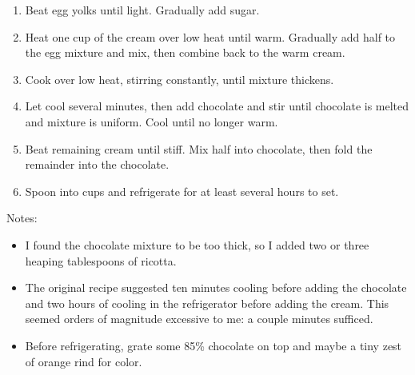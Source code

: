 
\begin{ingredients}
\end{ingredients}


\begin{recipe}
  \begin{enumerate}

  \item Beat egg yolks until light.  Gradually add sugar.

  \item Heat one cup of the cream over low heat until warm.  Gradually
    add half to the egg mixture and mix, then combine back to the warm
    cream.

  \item Cook over low heat, stirring constantly, until mixture
    thickens.

  \item Let cool several minutes, then add chocolate and stir until
    chocolate is melted and mixture is uniform.  Cool until no longer
    warm.

  \item Beat remaining cream until stiff.  Mix half into chocolate,
    then fold the remainder into the chocolate.

  \item Spoon into cups and refrigerate for at least several hours to
    set.

  \end{enumerate}

Notes:
\begin{itemize}
\item I found the chocolate mixture to be too thick, so I added two or
  three heaping tablespoons of ricotta.

\item The original recipe suggested ten minutes cooling before adding
  the chocolate and two hours of cooling in the refrigerator before
  adding the cream.  This seemed orders of magnitude excessive to me:
  a couple minutes sufficed.

\item Before refrigerating, grate some 85\% chocolate on top and maybe
  a tiny zest of orange rind for color.
\end{itemize}

\end{recipe}
